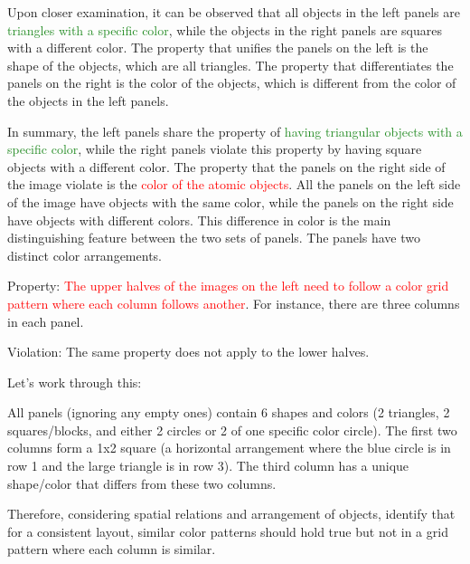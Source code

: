\begin{tcolorbox}[breakable,enhanced jigsaw,opacityback=0,]
\begin{dialogue}
		Upon closer examination, it can be observed that all objects in the left panels are \textcolor{ForestGreen}{triangles with a specific color}, while the objects in the right panels are squares with a different color. The property that unifies the panels on the left is the shape of the objects, which are all triangles. The property that differentiates the panels on the right is the color of the objects, which is different from the color of the objects in the left panels.
		
		In summary, the left panels share the property of \textcolor{ForestGreen}{having triangular objects with a specific color}, while the right panels violate this property by having square objects with a different color.
		\vspace{1em}
		 The property that the panels on the right side of the image violate is the \textcolor{red}{color of the atomic objects}. All the panels on the left side of the image have objects with the same color, while the panels on the right side have objects with different colors. This difference in color is the main distinguishing feature between the two sets of panels.
		\vspace{1em}
		 The panels have two distinct color arrangements.
		
		Property: \textcolor{red}{The upper halves of the images on the left need to follow a color grid pattern where each column follows another}. For instance, there are three columns in each panel.
		
		Violation: The same property does not apply to the lower halves.
		
		Let's work through this:
		
		All panels (ignoring any empty ones) contain 6 shapes and colors (2 triangles, 2 squares/blocks, and either 2 circles or 2 of one specific color circle).
		The first two columns form a 1x2 square (a horizontal arrangement where the blue circle is in row 1 and the large triangle is in row 3). The third column has a unique shape/color that differs from these two columns.
		
		Therefore, considering spatial relations and arrangement of objects, identify that for a consistent layout, similar color patterns should hold true but not in a grid pattern where each column is similar.
	\end{dialogue}
	\label{fig:task9-bongard}
\end{tcolorbox}




